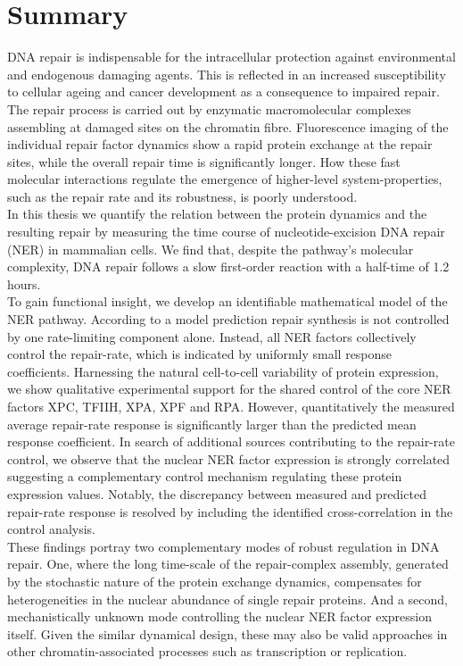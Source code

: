 \chapter*{Summary}
\thispagestyle{plain2}





DNA repair is indispensable for the intracellular protection against environmental and endogenous damaging agents. This is reflected in an increased susceptibility to cellular ageing and cancer development as a consequence to impaired repair. The repair process is carried out by enzymatic macromolecular complexes assembling at damaged sites on the chromatin fibre. Fluorescence imaging of the individual repair factor dynamics show a rapid protein exchange at the repair sites, while the overall repair time is significantly longer. How these fast molecular interactions regulate the emergence of higher-level system-properties, such as the repair rate and its robustness, is poorly understood.\\ 
In this thesis we quantify the relation between the protein dynamics and the resulting repair by measuring the time course of nucleotide-excision DNA repair (NER) in mammalian cells. We find that, despite the pathway's molecular complexity, DNA repair follows a slow first-order reaction with a half-time of 1.2 hours. \\
To gain functional insight, we develop an identifiable mathematical model of the NER pathway. According to a model prediction repair synthesis is not controlled by one rate-limiting component alone. Instead, all NER factors collectively control the repair-rate, which is indicated by uniformly small response coefficients. Harnessing the natural cell-to-cell variability of protein expression, we show qualitative experimental support for the shared control of the core NER factors XPC, TFIIH, XPA, XPF and RPA. However, quantitatively the measured average repair-rate response is significantly larger than the predicted mean response coefficient. In search of additional sources contributing to the repair-rate control, we observe that the nuclear NER factor expression is strongly correlated suggesting a complementary control mechanism regulating these protein expression values. Notably, the discrepancy between measured and predicted repair-rate response is resolved by including the identified cross-correlation in the control analysis. \\ 
These findings portray two complementary modes of robust regulation in DNA repair. One, where the long time-scale of the repair-complex assembly, generated by the stochastic nature of the protein exchange dynamics, compensates for heterogeneities in the nuclear abundance of single repair proteins. And a second, mechanistically unknown mode controlling the nuclear NER factor expression itself. Given the similar dynamical design, these may also be valid approaches in other chromatin-associated processes such as transcription or replication.    



      
 


%